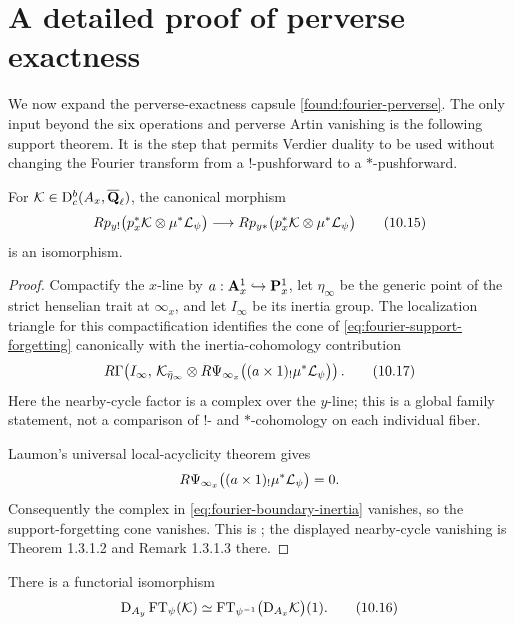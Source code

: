 \section{A detailed proof of perverse exactness}
\label{sec:fourier-perverse-exactness-detail}

We now expand the perverse-exactness capsule
\cref{found:fourier-perverse}.  The only input beyond the six operations and
perverse Artin vanishing is the following support theorem.  It is the step
that permits Verdier duality to be used without changing the Fourier
transform from a \(!\)-pushforward to a \(*\)-pushforward.

\begin{theorem}
\label{thm:fourier-support-forgetting}
For \(\mathcal K\in\mathrm D^b_c(A_x,\overline{\mathbf Q}_\ell)\), the canonical morphism
\[
 Rp_{y!}\bigl(p_x^*\mathcal K\otimes\mu^*\mathcal L_\psi\bigr)
 \longrightarrow
 Rp_{y*}\bigl(p_x^*\mathcal K\otimes\mu^*\mathcal L_\psi\bigr)
\tag{10.15}\label{eq:fourier-support-forgetting}
\]
is an isomorphism.
\end{theorem}

\begin{proof}
Compactify the \(x\)-line by
\(a:\mathbf A^1_x\hookrightarrow\mathbf P^1_x\), let
\(\eta_\infty\) be the generic point of the strict henselian trait at
\(\infty_x\), and let \(I_\infty\) be its inertia group.  The localization
triangle for this compactification identifies the cone of
\eqref{eq:fourier-support-forgetting} canonically with the
inertia-cohomology contribution
\[
 R\Gamma\!\left(
 I_\infty,\,
 \mathcal K_{\bar\eta_\infty}\otimes
 R\Psi_{\infty_x}\bigl((a\times1)_!\mu^*\mathcal L_\psi\bigr)
 \right).
\tag{10.17}\label{eq:fourier-boundary-inertia}
\]
Here the nearby-cycle factor is a complex over the \(y\)-line; this is a
global family statement, not a comparison of \(!\)- and \(*\)-cohomology on
each individual fiber.

Laumon's universal local-acyclicity theorem gives
\[
 R\Psi_{\infty_x}\bigl((a\times1)_!\mu^*\mathcal L_\psi\bigr)=0.
\]
Consequently the complex in
\eqref{eq:fourier-boundary-inertia} vanishes, so the support-forgetting cone
vanishes.  This is \cite[Thm.~1.3.1.1]{LaumonFourier}; the displayed
nearby-cycle vanishing is Theorem 1.3.1.2 and Remark 1.3.1.3 there.
\end{proof}

\begin{proposition}
\label{prop:fourier-verdier-detailed}
There is a functorial isomorphism
\[
 \mathrm D_{A_y}\operatorname{FT}_\psi(\mathcal K)
 \simeq
 \operatorname{FT}_{\psi^{-1}}\bigl(\mathrm D_{A_x}\mathcal K\bigr)(1).
\tag{10.16}\label{eq:fourier-verdier-detailed}
\]
\end{proposition}

